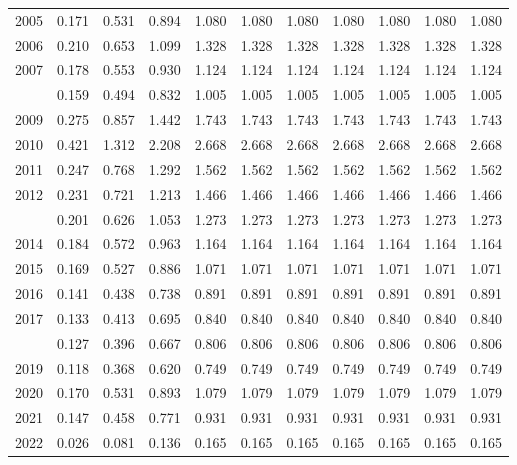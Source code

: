 \documentclass[
]{article}
\begin{document}
\begin{longtable}[t]{lrrrrrrrrrr}
2005 & 0.171 & 0.531 & 0.894 & 1.080 & 1.080 & 1.080 & 1.080 & 1.080 & 1.080 & 1.080\\
2006 & 0.210 & 0.653 & 1.099 & 1.328 & 1.328 & 1.328 & 1.328 & 1.328 & 1.328 & 1.328\\
2007 & 0.178 & 0.553 & 0.930 & 1.124 & 1.124 & 1.124 & 1.124 & 1.124 & 1.124 & 1.124\\
\addlinespace
2008 & 0.159 & 0.494 & 0.832 & 1.005 & 1.005 & 1.005 & 1.005 & 1.005 & 1.005 & 1.005\\
2009 & 0.275 & 0.857 & 1.442 & 1.743 & 1.743 & 1.743 & 1.743 & 1.743 & 1.743 & 1.743\\
2010 & 0.421 & 1.312 & 2.208 & 2.668 & 2.668 & 2.668 & 2.668 & 2.668 & 2.668 & 2.668\\
2011 & 0.247 & 0.768 & 1.292 & 1.562 & 1.562 & 1.562 & 1.562 & 1.562 & 1.562 & 1.562\\
2012 & 0.231 & 0.721 & 1.213 & 1.466 & 1.466 & 1.466 & 1.466 & 1.466 & 1.466 & 1.466\\
\addlinespace
2013 & 0.201 & 0.626 & 1.053 & 1.273 & 1.273 & 1.273 & 1.273 & 1.273 & 1.273 & 1.273\\
2014 & 0.184 & 0.572 & 0.963 & 1.164 & 1.164 & 1.164 & 1.164 & 1.164 & 1.164 & 1.164\\
2015 & 0.169 & 0.527 & 0.886 & 1.071 & 1.071 & 1.071 & 1.071 & 1.071 & 1.071 & 1.071\\
2016 & 0.141 & 0.438 & 0.738 & 0.891 & 0.891 & 0.891 & 0.891 & 0.891 & 0.891 & 0.891\\
2017 & 0.133 & 0.413 & 0.695 & 0.840 & 0.840 & 0.840 & 0.840 & 0.840 & 0.840 & 0.840\\
\addlinespace
2018 & 0.127 & 0.396 & 0.667 & 0.806 & 0.806 & 0.806 & 0.806 & 0.806 & 0.806 & 0.806\\
2019 & 0.118 & 0.368 & 0.620 & 0.749 & 0.749 & 0.749 & 0.749 & 0.749 & 0.749 & 0.749\\
2020 & 0.170 & 0.531 & 0.893 & 1.079 & 1.079 & 1.079 & 1.079 & 1.079 & 1.079 & 1.079\\
2021 & 0.147 & 0.458 & 0.771 & 0.931 & 0.931 & 0.931 & 0.931 & 0.931 & 0.931 & 0.931\\
2022 & 0.026 & 0.081 & 0.136 & 0.165 & 0.165 & 0.165 & 0.165 & 0.165 & 0.165 & 0.165\\*
\end{longtable}
\end{document}
